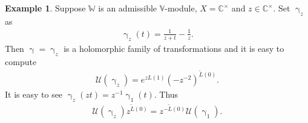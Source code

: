 \documentclass[11pt,b5paper,notitlepage]{article}
\theoremstyle{definition}
\newtheorem{eg}[df]{Example}
\theoremstyle{plain}
\newcommand{\mc}{\mathcal}
\newcommand{\wtd}{\widetilde}
\newcommand{\Vbb}{\mathbb V}
\newcommand{\Wbb}{\mathbb W}
\newcommand{\Cbb}{\mathbb C}
\newcommand{\<}{\left\langle}
\renewcommand{\>}{\right\rangle}
\newcommand{\MU}{\mathcal{U}}
\numberwithin{equation}{section}
\begin{document}
\begin{eg}\label{changeexample1}
    Suppose $\Wbb$ is an admissible $\Vbb$-module, $X=\Cbb^\times$ and $z\in \Cbb^\times$. Set $\upgamma_z$ as 
    \begin{align*}
        \upgamma_z(t)=\frac{1}{z+t}-\frac{1}{z}.
    \end{align*}
    Then $\upgamma=\upgamma_z$ is a holomorphic family of transformations and it is easy to compute \index{U@$\MU(\upgamma_z)$}
    \begin{align}
        \MU(\upgamma_z)=e^{zL(1)}(-z^{-2})^{\wtd L(0)}.  \label{eq40}
    \end{align}
It is easy to see $\upgamma_z(zt)=z^{-1}\upgamma_1(t)$. Thus
\begin{align}
\mc U(\upgamma_z)z^{\wtd L(0)}=z^{-\wtd L(0)}\mc U(\upgamma_1).  \label{eq43}
\end{align}
\end{eg}
\end{document}
